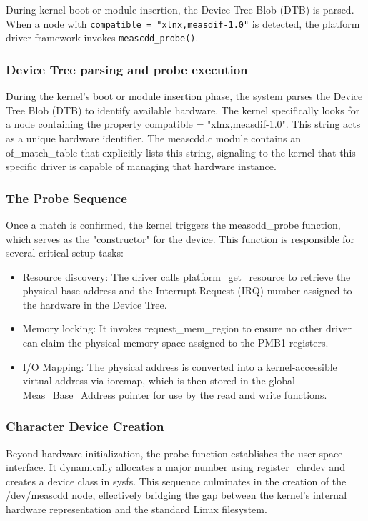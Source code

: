 During kernel boot or module insertion, the Device Tree Blob (DTB) is parsed. When a node with \texttt{compatible = "xlnx,measdif-1.0"} is detected, the platform driver framework invokes \texttt{meascdd\_probe()}.



\subsubsection{Device Tree parsing and probe execution}
During the kernel's boot or module insertion phase, the system parses the Device Tree Blob (DTB) to identify available hardware. The kernel specifically looks for a node containing the property compatible = "xlnx,measdif-1.0". This string acts as a unique hardware identifier. The meascdd.c module contains an of\_match\_table that explicitly lists this string, signaling to the kernel that this specific driver is capable of managing that hardware instance.

\subsubsection{The Probe Sequence}
Once a match is confirmed, the kernel triggers the meascdd\_probe function, which serves as the "constructor" for the device. This function is responsible for several critical setup tasks:
\begin{itemize}
\item Resource discovery: The driver calls platform\_get\_resource to retrieve the physical base address and the Interrupt Request (IRQ) number assigned to the hardware in the Device Tree.
\item Memory locking: It invokes request\_mem\_region to ensure no other driver can claim the physical memory space assigned to the PMB1 registers.
\item I/O Mapping: The physical address is converted into a kernel-accessible virtual address via ioremap, which is then stored in the global Meas\_Base\_Address pointer for use by the read and write functions.
\end{itemize}

\subsubsection{Character Device Creation}
Beyond hardware initialization, the probe function establishes the user-space interface. It dynamically allocates a major number using register\_chrdev and creates a device class in sysfs. This sequence culminates in the creation of the /dev/meascdd node, effectively bridging the gap between the kernel's internal hardware representation and the standard Linux filesystem.


